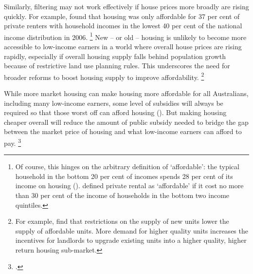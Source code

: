 Similarly, filtering may not work effectively if house prices more broadly are rising quickly. For example, \textcite{AHURI-2011-affordable-rental} found that housing was only affordable for 37 per cent of private renters with household incomes in the lowest 40 per cent of the national income distribution in 2006.%
    \footnote{Of course, this hinges on the arbitrary definition of `affordable': the typical household in the bottom 20 per cent of incomes spends 28 per cent of its income on housing (). \textcite{AHURI-2011-affordable-rental}
    defined private rental as `affordable' if it cost no more than 30 per cent of the income of households in the bottom two income quintiles.}
New -- or old -- housing is unlikely to become more accessible to low-income earners in a world where overall house prices are rising rapidly, especially if overall housing supply falls behind population growth because of restrictive land use planning rules. This underscores the need for broader reforms to boost housing supply to improve affordability.%
    \footnote{For example, \textcite{Somerville-Mayer-2003-govt-reg-affordable-housing} find that restrictions on the supply of new units lower the supply of affordable units. More demand for higher quality units increases the incentives for landlords to upgrade existing units into a higher quality, higher return housing sub-market.}

While more market housing can make housing more affordable for all Australians, including many low-income earners, some level of subsidies will always be required so that those worst off can afford housing (). But making housing cheaper overall will reduce the amount of public subsidy needed to bridge the gap between the market price of housing and what low-income earners can afford to pay.%
    \footcite[][1]{Daley-etal-2017-Submission-Natl-housing-finance}

